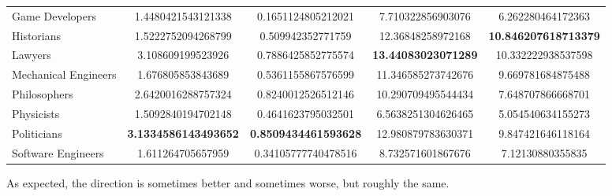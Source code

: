 {\begin{tabular}{lSSSS}
    Game Developers      & 1.4480421543121338                                 & 0.1651124805212021                                 & 7.710322856903076                                 & 6.262280464172363                                  \\
    Historians           & 1.5222752094268799                                 & 0.509942352771759                                  & 12.36848258972168                                 &  \bfseries 10.846207618713379 \\
    Lawyers              & 3.108609199523926                                  & 0.7886425852775574                                 &  \bfseries 13.44083023071289 & 10.332222938537598                                 \\
    Mechanical Engineers & 1.676805853843689                                  & 0.5361155867576599                                 & 11.346585273742676                                & 9.669781684875488                                  \\
    Philosophers         & 2.6420016288757324                                 & 0.8240012526512146                                 & 10.290709495544434                                & 7.648707866668701                                  \\
    Physicists           & 1.5092840194702148                                 & 0.4641623795032501                                 & 6.5638251304626465                                & 5.054540634155273                                  \\
    Politicians          &  \bfseries 3.1334586143493652 &  \bfseries 0.8509434461593628 & 12.980879783630371                                & 9.847421646118164                                  \\
    Software Engineers   & 1.611264705657959                                  & 0.34105777740478516                                & 8.732571601867676                                 & 7.12130880355835                                   \\
    \bottomrule
  \end{tabular}
}

As expected, the direction is sometimes better and sometimes worse, but roughly the same.